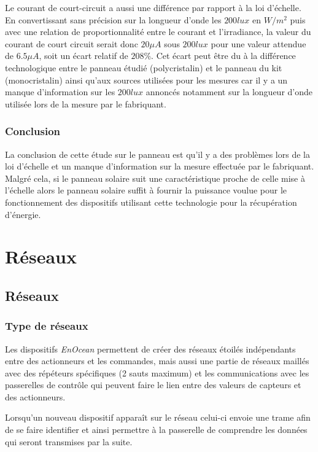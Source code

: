 \documentclass{rapportENS}
\begin{document}
Le courant de court-circuit a aussi une différence par rapport à la loi d'échelle. En convertissant sans précision sur la longueur d'onde les $200 lux$ en $W/m^2$ puis avec une relation de proportionnalité entre le courant et l'irradiance, la valeur du courant de court circuit serait donc $20\mu A$ sous $200  lux$ pour une valeur attendue de $6.5\mu A$,  soit un écart relatif de $208\%$. Cet écart peut être du à la différence technologique entre le panneau étudié (polycristalin) et  le panneau du kit (monocristalin) ainsi qu'aux sources utilisées pour les mesures car il y a un manque d'information sur les $200 lux$ annoncés notamment sur la longueur d'onde utilisée lors de la mesure par le fabriquant. 
 
 \subsubsection{Conclusion}
 La conclusion de cette étude sur le panneau est qu'il y a des problèmes lors de la loi d'échelle et un manque d'information sur la mesure effectuée par le fabriquant. Malgré cela, si le panneau solaire suit une caractéristique proche de celle mise à l'échelle alors le panneau solaire suffit à fournir la puissance voulue pour le fonctionnement des dispositifs utilisant cette technologie pour la récupération d'énergie.
 
 \section{Réseaux}
 \subsection{Réseaux}
 \subsubsection{Type de réseaux}
 
 Les dispositifs \textit{EnOcean} permettent de créer des réseaux étoilés indépendants entre des actionneurs et les commandes, mais aussi une partie de réseaux maillés avec des répéteurs spécifiques (2 sauts maximum) et les communications avec les passerelles de contrôle qui peuvent faire le lien entre des valeurs de capteurs et des actionneurs.
 
 Lorsqu'un nouveau dispositif apparaît sur le réseau celui-ci envoie une trame afin de se faire identifier et ainsi permettre à la passerelle de comprendre les données qui seront transmises par la suite.
 
\end{document}

